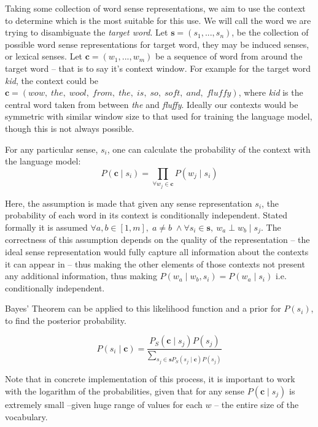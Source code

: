 \documentclass{sig-alternate}
\renewcommand{\c}{\mathbf{c}}
\newcommand{\s}{\mathbf{s}}
\begin{document}
Taking some collection of word sense representations, we aim to use the context to determine which is the most suitable for this use.
We will call the word we are trying to disambiguate the \emph{target word}.
Let $\s=(s_{1},...,s_{n})$, be the collection of possible word sense representations for target word, they may be induced senses, or lexical senses.
Let $\c=(w_{1},...,w_{m})$ be a sequence of word from around the target word -- that is to say it's context window.
For example for the target word \emph{kid}, the context could be {$\c=(wow,\; the,\; wool,\; from,\; the,\; is,\; so,\; soft,\; and,\; fluffy)$}, where \emph{kid} is the central word taken from between \emph{the} and \emph{fluffy}.
Ideally our contexts would be symmetric with similar window size to that used for training the language model, though this is not always possible.

For any particular sense, $s_i$, one can calculate the probability of the context with the language model:
\begin{equation} \label{eq:contextprobtrue}
 P(\c \mid s_{i})=\prod_{\forall w_{j}\in\c}P(w_{j} \mid s_{i})
\end{equation}

Here, the assumption is made that given any sense representation $s_i$, the probability of each word in its context is conditionally independent. Stated formally it is assumed $\forall a,b \in [1,m],\; a \ne b\; \wedge \forall s_i \in \s,\:w_a \perp w_b \mid s_j$.
The correctness of this assumption depends on the quality of the representation -- the ideal sense representation would fully capture all information about the contexts it can appear in -- thus making the other elements of those contexts not present any additional information, thus making $P(w_a \mid w_b,s_i)=P(w_a \mid s_i)$ i.e. conditionally independent.


Bayes' Theorem can be applied to this likelihood function and a prior for $P(s_i)$, to find the posterior probability.

\begin{equation} \label{eq:generalwsd}
P(s_{i} \mid \c) = \dfrac{P_S(\c \mid s_{j})P(s_{j})}{\sum_{s_{j}\in\s P_S(s_{j} \mid \c)P(s_{j})}}
\end{equation}

Note that in concrete implementation of this process, it is important to work with the logarithm of the probabilities, given that for any sense $P(\c \mid s_j)$ is extremely small --given huge range of values for each $w$ -- the entire size of the vocabulary.
\end{document}
